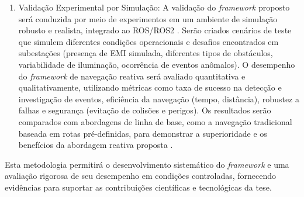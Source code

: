 \begin{enumerate}
    \item Validação Experimental por Simulação: A validação do \textit{framework} proposto será conduzida por meio de experimentos em um ambiente de simulação robusto e realista, integrado ao ROS/ROS2 \cite{NVIDIA2024Simulation}. Serão criados cenários de teste que simulem diferentes condições operacionais e desafios encontrados em subestações (presença de EMI simulada, diferentes tipos de obstáculos, variabilidade de iluminação, ocorrência de eventos anômalos). O desempenho do \textit{framework} de navegação reativa será avaliado quantitativa e qualitativamente, utilizando métricas como taxa de sucesso na detecção e investigação de eventos, eficiência da navegação (tempo, distância), robustez a falhas e segurança (evitação de colisões e perigos). Os resultados serão comparados com abordagens de linha de base, como a navegação tradicional baseada em rotas pré-definidas, para demonstrar a superioridade e os benefícios da abordagem reativa proposta \cite{collins2021simulation, Garbacea2022FrameworkVV}.
\end{enumerate}
    
Esta metodologia permitirá o desenvolvimento sistemático do \textit{framework} e uma avaliação rigorosa de seu desempenho em condições controladas, fornecendo evidências para suportar as contribuições científicas e tecnológicas da tese.


